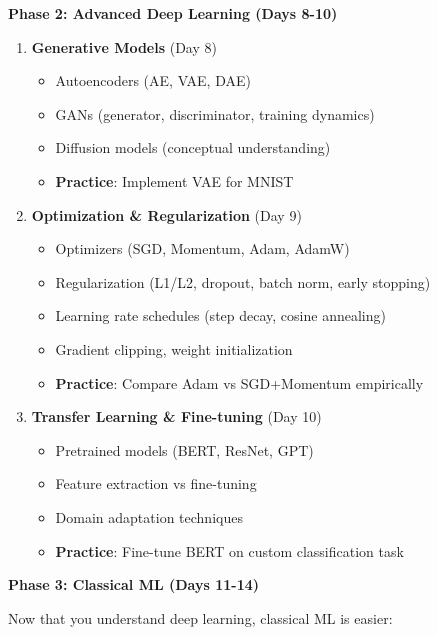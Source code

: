 \documentclass[10pt]{article}
\begin{document}
\textbf{Phase 2: Advanced Deep Learning (Days 8-10)}

\begin{enumerate}
\item \textbf{Generative Models} (Day 8)
\begin{itemize}
\item Autoencoders (AE, VAE, DAE)
\item GANs (generator, discriminator, training dynamics)
\item Diffusion models (conceptual understanding)
\item \textbf{Practice}: Implement VAE for MNIST
\end{itemize}

\item \textbf{Optimization \& Regularization} (Day 9)
\begin{itemize}
\item Optimizers (SGD, Momentum, Adam, AdamW)
\item Regularization (L1/L2, dropout, batch norm, early stopping)
\item Learning rate schedules (step decay, cosine annealing)
\item Gradient clipping, weight initialization
\item \textbf{Practice}: Compare Adam vs SGD+Momentum empirically
\end{itemize}

\item \textbf{Transfer Learning \& Fine-tuning} (Day 10)
\begin{itemize}
\item Pretrained models (BERT, ResNet, GPT)
\item Feature extraction vs fine-tuning
\item Domain adaptation techniques
\item \textbf{Practice}: Fine-tune BERT on custom classification task
\end{itemize}
\end{enumerate}

\textbf{Phase 3: Classical ML (Days 11-14)}

Now that you understand deep learning, classical ML is easier:
\end{document}
